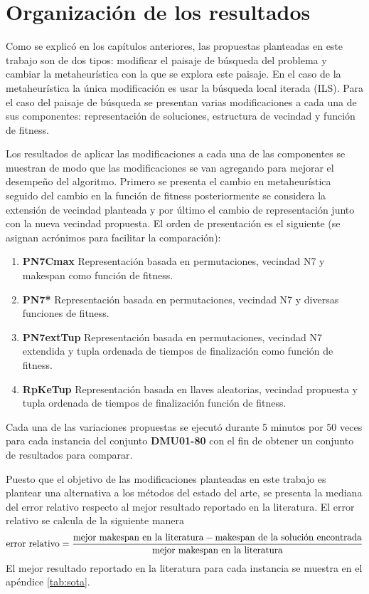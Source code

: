 \section{Organización de los resultados}
Como se explicó en los capítulos anteriores, las propuestas planteadas en este trabajo son de dos tipos: modificar el paisaje de búsqueda del problema y cambiar la metaheurística con la que se explora este paisaje.
En el caso de la metaheurística la única modificación es usar la búsqueda local iterada (ILS). Para el caso del paisaje de búsqueda se presentan varias modificaciones a cada una de sus componentes: representación de soluciones, estructura de vecindad y función de fitness.

Los resultados de aplicar las modificaciones a cada una de las componentes se muestran de modo que las modificaciones se van agregando para mejorar el desempeño del algoritmo. Primero se presenta el cambio en metaheurística seguido del cambio en la función de fitness posteriormente se considera la extensión de vecindad planteada y por último el cambio de representación junto con la nueva vecindad propuesta. El orden de presentación es el siguiente (se asignan acrónimos para facilitar la comparación):
\begin{enumerate}
    \item \textbf{PN7Cmax} Representación basada en permutaciones, vecindad N7 y makespan como función de fitness.
    \item \textbf{PN7*} Representación basada en permutaciones, vecindad N7 y diversas funciones de fitness.
    \item \textbf{PN7extTup} Representación basada en permutaciones, vecindad N7 extendida y tupla ordenada de tiempos de finalización como función de fitness.
    \item \textbf{RpKeTup} Representación basada en llaves aleatorias, vecindad propuesta y tupla ordenada de tiempos de finalización función de fitness.
\end{enumerate}

Cada una de las variaciones propuestas se ejecutó durante 5 minutos por 50 veces para cada instancia del conjunto \textbf{DMU01-80} con el fin de obtener un conjunto de resultados para comparar.

Puesto que el objetivo de las modificaciones planteadas en este trabajo es plantear una alternativa a los métodos del estado del arte, se presenta la mediana del error relativo respecto al mejor resultado reportado en la literatura. El error relativo se calcula de la siguiente manera \[\text{error relativo}= \frac{\text{mejor makespan en la literatura}-\text{makespan de la solución encontrada}}{\text{\text{mejor makespan en la literatura}}}\]
El mejor resultado reportado en la literatura para cada instancia se muestra en el apéndice \ref{tab:sota}.

